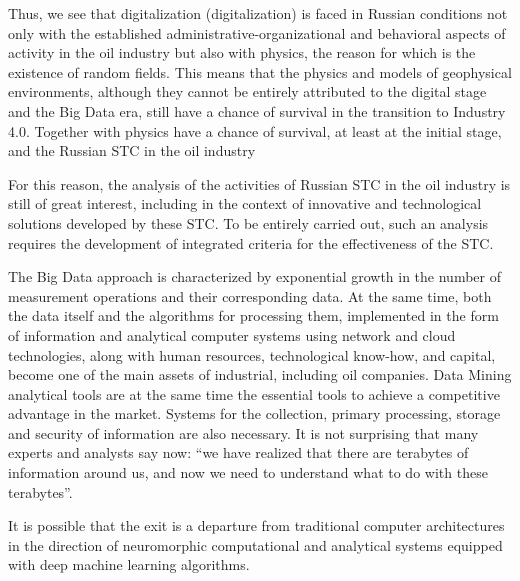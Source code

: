 \documentclass[12pt]{report}
\theoremstyle{definition}
\begin{document}
Thus, we see that digitalization (digitalization) is faced in Russian conditions not only with the established administrative-organizational and behavioral aspects of activity in the oil industry but also with physics, the reason for which is the existence of random fields.
This means that the physics and models of geophysical environments, although they cannot be entirely attributed to the digital stage and the Big Data era, still have a chance of survival in the transition to Industry 4.0.
Together with physics have a chance of survival, at least at the initial stage, and the Russian STC in the oil industry

For this reason, the analysis of the activities of Russian STC in the oil industry is still of great interest, including in the context of innovative and technological solutions developed by these STC.
To be entirely carried out, such an analysis requires the development of integrated criteria for the effectiveness of the STC.

The Big Data approach is characterized by exponential growth in the number of measurement operations and their corresponding data.
At the same time, both the data itself and the algorithms for processing them, implemented in the form of information and analytical computer systems using network and cloud technologies, along with human resources, technological know-how, and capital, become one of the main assets of industrial, including oil companies.
Data Mining analytical tools are at the same time the essential tools to achieve a competitive advantage in the market.
Systems for the collection, primary processing, storage and security of information are also necessary.
It is not surprising that many experts and analysts say now: ``we have realized that there are terabytes of information around us, and now we need to understand what to do with these terabytes''.

It is possible that the exit is a departure from traditional computer architectures in the direction of neuromorphic computational and analytical systems equipped with deep machine learning algorithms.
\end{document}
